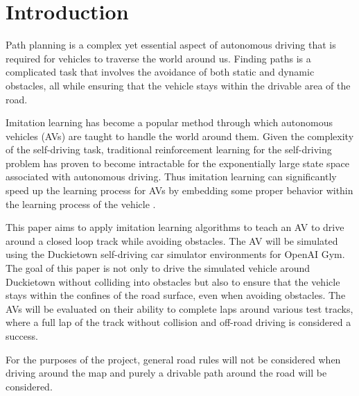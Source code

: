 \documentclass[conference]{IEEEtran}
\begin{document}
\section{Introduction}
Path planning is a complex yet essential aspect of autonomous driving that is required
for vehicles to traverse the world around us. Finding paths is a complicated task that 
involves the avoidance of both static and dynamic obstacles, all while ensuring that the
vehicle stays within the drivable area of the road. \par
Imitation learning has become a popular method through which autonomous vehicles (AVs) are 
taught to handle the world around them. Given the complexity of the self-driving task,
traditional reinforcement learning for the self-driving problem has proven to become intractable
for the exponentially large state space associated with autonomous driving. Thus imitation learning
can significantly speed up the learning process for AVs by embedding some proper behavior within 
the learning process of the vehicle \cite{imitationLearning}. \par
This paper aims to apply imitation learning algorithms to teach an AV to drive around a closed loop
track while avoiding obstacles. The AV will be simulated using the Duckietown \cite{gym_duckietown} 
self-driving car simulator environments for OpenAI Gym. The goal of this paper is not only to
drive the simulated vehicle around Duckietown without colliding into obstacles but also to ensure
that the vehicle stays within the confines of the road surface, even when avoiding obstacles. 
The AVs will be evaluated on their ability to complete laps around various test tracks, where a 
full lap of the track without collision and off-road driving is considered a success. \par
For the purposes of the project, general road rules will not be considered when driving
around the map and purely a drivable path around the road will be considered. 
\end{document}
